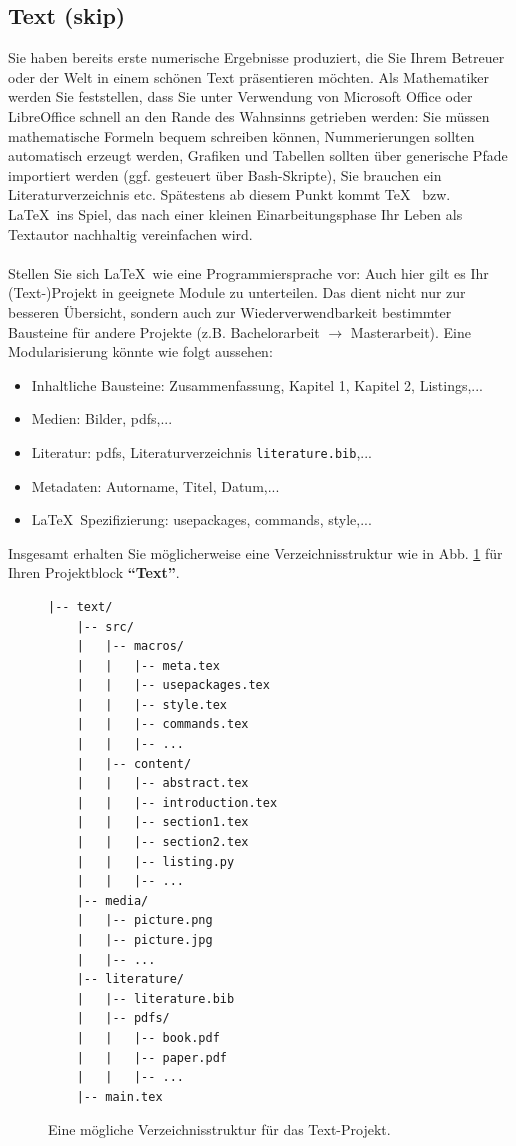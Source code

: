 \subsection{Text (skip)}
Sie haben bereits erste numerische Ergebnisse produziert, die Sie Ihrem Betreuer oder der Welt in einem schönen Text präsentieren möchten. Als Mathematiker werden Sie feststellen, dass Sie unter Verwendung von Microsoft Office oder LibreOffice schnell an den Rande des Wahnsinns getrieben werden: Sie müssen mathematische Formeln bequem schreiben können, Nummerierungen sollten automatisch erzeugt werden, Grafiken und Tabellen sollten über generische Pfade importiert werden (ggf. gesteuert über Bash-Skripte), Sie brauchen ein Literaturverzeichnis etc. Spätestens ab diesem Punkt kommt \TeX~ bzw. \LaTeX~ins Spiel, das nach einer kleinen Einarbeitungsphase Ihr Leben als Textautor nachhaltig vereinfachen wird.\\
~\\
Stellen Sie sich \LaTeX~wie eine Programmiersprache vor: Auch hier gilt es Ihr (Text-)Projekt in geeignete Module zu unterteilen. Das dient nicht nur zur besseren Übersicht, sondern auch zur Wiederverwendbarkeit bestimmter Bausteine für andere Projekte (z.B. Bachelorarbeit $\to$ Masterarbeit). Eine Modularisierung könnte wie folgt aussehen:
\begin{itemize}
	\item Inhaltliche Bausteine: Zusammenfassung, Kapitel 1, Kapitel 2, Listings,...
	\item Medien: Bilder, pdfs,...
	\item Literatur: pdfs, Literaturverzeichnis \texttt{literature.bib},...
	\item Metadaten: Autorname, Titel, Datum,...
	\item \LaTeX~Spezifizierung: usepackages, commands, style,...
\end{itemize}
Insgesamt erhalten Sie möglicherweise eine Verzeichnisstruktur wie in Abb. \ref{fig:vz-struktur-text} für Ihren Projektblock \textbf{``Text''}.\\
\begin{figure}[h!]
	\centering
\begin{minipage}{0.4\textwidth}
\begin{verbatim}
|-- text/
    |-- src/
    |   |-- macros/
    |   |   |-- meta.tex
    |   |   |-- usepackages.tex
    |   |   |-- style.tex
    |   |   |-- commands.tex
    |   |   |-- ...
    |   |-- content/
    |   |   |-- abstract.tex
    |   |   |-- introduction.tex
    |   |   |-- section1.tex
    |   |   |-- section2.tex
    |   |   |-- listing.py
    |   |   |-- ...
    |-- media/
    |   |-- picture.png
    |   |-- picture.jpg
    |   |-- ...
    |-- literature/
    |   |-- literature.bib
    |   |-- pdfs/
    |   |   |-- book.pdf
    |   |   |-- paper.pdf
    |   |   |-- ...
    |-- main.tex
\end{verbatim}
\end{minipage}
	\caption[Beispiel: Verzeichnisstruktur für \texttt{text}]{Eine mögliche Verzeichnisstruktur für das Text-Projekt.}
	\label{fig:vz-struktur-text}
\end{figure}
